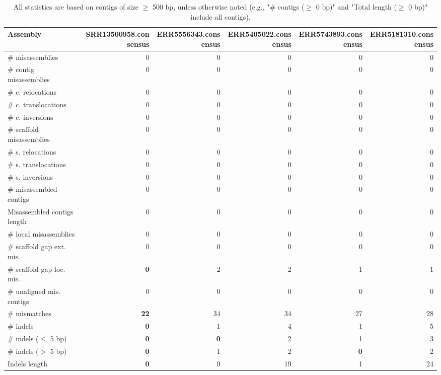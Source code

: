 \documentclass[12pt,a4paper]{article}
\begin{document}
\begin{table}[ht]
\begin{center}
\caption{All statistics are based on contigs of size $\geq$ 500 bp, unless otherwise noted (e.g., "\# contigs ($\geq$ 0 bp)" and "Total length ($\geq$ 0 bp)" include all contigs).}
\begin{tabular}{|l*{5}{|r}|}
\hline
Assembly & SRR13500958.consensus & ERR5556343.consensus & ERR5405022.consensus & ERR5743893.consensus & ERR5181310.consensus \\ \hline
\# misassemblies & 0 & 0 & 0 & 0 & 0 \\ \hline
\hspace{2mm}\# contig misassemblies & 0 & 0 & 0 & 0 & 0 \\ \hline
\hspace{5mm}\# c. relocations & 0 & 0 & 0 & 0 & 0 \\ \hline
\hspace{5mm}\# c. translocations & 0 & 0 & 0 & 0 & 0 \\ \hline
\hspace{5mm}\# c. inversions & 0 & 0 & 0 & 0 & 0 \\ \hline
\hspace{2mm}\# scaffold misassemblies & 0 & 0 & 0 & 0 & 0 \\ \hline
\hspace{5mm}\# s. relocations & 0 & 0 & 0 & 0 & 0 \\ \hline
\hspace{5mm}\# s. translocations & 0 & 0 & 0 & 0 & 0 \\ \hline
\hspace{5mm}\# s. inversions & 0 & 0 & 0 & 0 & 0 \\ \hline
\# misassembled contigs & 0 & 0 & 0 & 0 & 0 \\ \hline
Misassembled contigs length & 0 & 0 & 0 & 0 & 0 \\ \hline
\# local misassemblies & 0 & 0 & 0 & 0 & 0 \\ \hline
\# scaffold gap ext. mis. & 0 & 0 & 0 & 0 & 0 \\ \hline
\# scaffold gap loc. mis. & {\bf 0} & 2 & 2 & 1 & 1 \\ \hline
\# unaligned mis. contigs & 0 & 0 & 0 & 0 & 0 \\ \hline
\# mismatches & {\bf 22} & 34 & 34 & 27 & 28 \\ \hline
\# indels & {\bf 0} & 1 & 4 & 1 & 5 \\ \hline
\hspace{5mm}\# indels ($\leq$ 5 bp) & {\bf 0} & {\bf 0} & 2 & 1 & 3 \\ \hline
\hspace{5mm}\# indels ($>$ 5 bp) & {\bf 0} & 1 & 2 & {\bf 0} & 2 \\ \hline
Indels length & {\bf 0} & 9 & 19 & 1 & 24 \\ \hline
\end{tabular}
\end{center}
\end{table}
\end{document}
